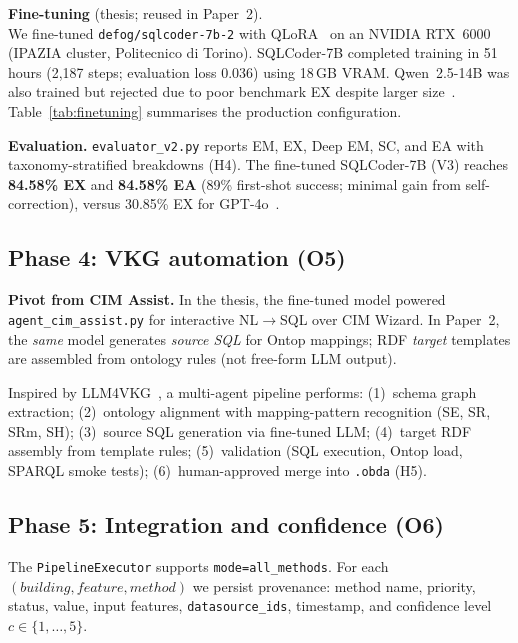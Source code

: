 \textbf{Fine-tuning} (thesis; reused in Paper~2).\\
We fine-tuned \texttt{defog/sqlcoder-7b-2} with QLoRA~\cite{dettmers2023qlora,hu2022lora} on an NVIDIA RTX~6000 (IPAZIA cluster, Politecnico di Torino).
SQLCoder-7B completed training in 51\,hours (2,187 steps; evaluation loss 0.036) using 18\,GB VRAM.
Qwen~2.5-14B was also trained but rejected due to poor benchmark EX despite larger size~\cite{taherdoust2025cimassist}.
Table~\ref{tab:finetuning} summarises the production configuration.



\textbf{Evaluation.}
\texttt{evaluator\_v2.py} reports EM, EX, Deep EM, SC, and EA with taxonomy-stratified breakdowns (H4).
The fine-tuned SQLCoder-7B (V3) reaches \textbf{84.58\% EX} and \textbf{84.58\% EA} (89\% first-shot success; minimal gain from self-correction), versus 30.85\% EX for GPT-4o~\cite{taherdoust2025cimassist}.

\subsection{Phase 4: VKG automation (O5)}

\textbf{Pivot from CIM Assist.}
In the thesis, the fine-tuned model powered \texttt{agent\_cim\_assist.py} for interactive NL$\rightarrow$SQL over CIM Wizard.
In Paper~2, the \emph{same} model generates \emph{source SQL} for Ontop mappings; RDF \emph{target} templates are assembled from ontology rules (not free-form LLM output).

Inspired by LLM4VKG~\cite{xiao2025llm4vkg}, a multi-agent pipeline performs:
(1)~schema graph extraction;
(2)~ontology alignment with mapping-pattern recognition (SE, SR, SRm, SH);
(3)~source SQL generation via fine-tuned LLM;
(4)~target RDF assembly from template rules;
(5)~validation (SQL execution, Ontop load, SPARQL smoke tests);
(6)~human-approved merge into \texttt{.obda} (H5).

\subsection{Phase 5: Integration and confidence (O6)}

The \texttt{PipelineExecutor} supports \texttt{mode=all\_methods}.
For each $(\mathit{building}, \mathit{feature}, \mathit{method})$ we persist provenance:
method name, priority, status, value, input features, \texttt{datasource\_ids}, timestamp, and confidence level $c \in \{1,\ldots,5\}$.

